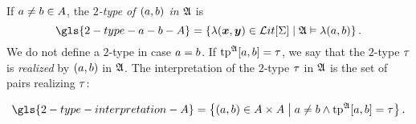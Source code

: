 If $a \neq b \in A$, the \emph{$2$-type of $(a, b)$ in $\mathfrak{A}$} is
\[
  \gls{2-type-a-b-A} = \setbd{\litl(\xx,\yy) \in \LitF\SigS}{\StrA \vDash
  \litl(\ea, \eb)}.
\]
We do not define a $2$-type in case $a = b$.
If $\operatorname{tp}^{\mathfrak{A}}[a,b] = \tau$, we say that the $2$-type $\tau$ is
\emph{realized} by $(a, b)$ in $\mathfrak{A}$. The interpretation of the $2$-type
$\tau$ in $\mathfrak{A}$ is the set of pairs realizing $\tau$:

\[
  \gls{2-type-interpretation-A} = \setbd{(\ea, \eb) \in
  \domA\cprod\domA}{\ea \neq \eb \land \tpIab\StrA\ea\eb = \tpTt}.
\]